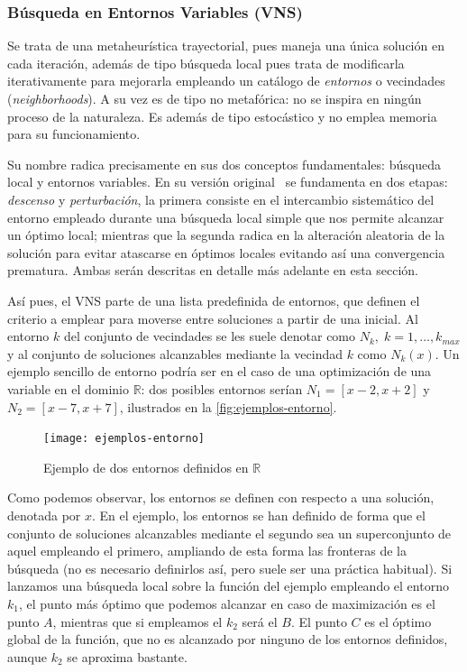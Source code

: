 \subsubsection{Búsqueda en Entornos Variables (VNS)} \label{sec:vns}
Se trata de una metaheurística trayectorial, pues maneja una única solución en cada iteración, además de tipo búsqueda local pues trata de modificarla iterativamente para mejorarla empleando un catálogo de \textit{entornos} o vecindades (\textit{neighborhoods}). A su vez es de tipo no metafórica: no se inspira en ningún proceso de la naturaleza. Es además de tipo estocástico y no emplea memoria para su funcionamiento.

Su nombre radica precisamente en sus dos conceptos fundamentales: búsqueda local y entornos variables. En su versión original~\cite{vns} se fundamenta en dos etapas: \textit{descenso} y \textit{perturbación}, la primera consiste en el intercambio sistemático del entorno empleado durante una búsqueda local simple que nos permite alcanzar un óptimo local; mientras que la segunda radica en la alteración aleatoria de la solución para evitar atascarse en óptimos locales evitando así una convergencia prematura. Ambas serán descritas en detalle más adelante en esta sección.

Así pues, el VNS parte de una lista predefinida de entornos, que definen el criterio a emplear para moverse entre soluciones a partir de una inicial. Al entorno $k$ del conjunto de vecindades se les suele denotar como $N_k, \; k=1,\dots,k_{max}$ y al conjunto de soluciones alcanzables mediante la vecindad $k$ como $N_k(x)$.
Un ejemplo sencillo de entorno podría ser en el caso de una optimización de una variable en el dominio $\mathbb{R}$: dos posibles entornos serían $N_1=[x-2, x+2]$ y $N_2=[x-7, x+7]$, ilustrados en la \autoref{fig:ejemplos-entorno}.

\begin{figure}[htbp]
    \centering
    \texttt{[image: ejemplos-entorno]}
    \caption{Ejemplo de dos entornos definidos en $\mathbb{R}$}
    \label{fig:ejemplos-entorno}
\end{figure}

Como podemos observar, los entornos se definen con respecto a una solución, denotada por $x$. En el ejemplo, los entornos se han definido de forma que el conjunto de soluciones alcanzables mediante el segundo sea un superconjunto de aquel empleando el primero, ampliando de esta forma las fronteras de la búsqueda (no es necesario definirlos así, pero suele ser una práctica habitual). Si lanzamos una búsqueda local sobre la función del ejemplo empleando el entorno $k_1$, el punto más óptimo que podemos alcanzar en caso de maximización es el punto $A$, mientras que si empleamos el $k_2$ será el $B$. El punto $C$ es el óptimo global de la función, que no es alcanzado por ninguno de los entornos definidos, aunque $k_2$ se aproxima bastante.

